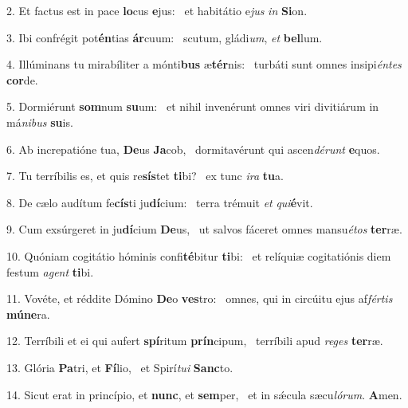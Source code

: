 2. Et factus est in pace \textbf{lo}cus \textbf{e}jus: \ast\  et habitátio e\textit{jus} \textit{in} \textbf{Si}on.\

3. Ibi confrégit pot\textbf{én}tias \textbf{ár}cuum: \ast\  scutum, gládi\textit{um}, \textit{et} \textbf{bel}lum.\

4. Illúminans tu mirabíliter a mónti\textbf{bus} æ\textbf{tér}nis: \ast\  turbáti sunt omnes insipi\textit{én}\textit{tes} \textbf{cor}de.\

5. Dormiérunt \textbf{som}num \textbf{su}um: \ast\  et nihil invenérunt omnes viri divitiárum in má\textit{ni}\textit{bus} \textbf{su}is.\

6. Ab increpatióne tua, \textbf{De}us \textbf{Ja}cob, \ast\  dormitavérunt qui ascen\textit{dé}\textit{runt} \textbf{e}quos.\

7. Tu terríbilis es, et quis re\textbf{sís}tet \textbf{ti}bi? \ast\  ex tunc \textit{i}\textit{ra} \textbf{tu}a.\

8. De cælo audítum fe\textbf{cís}ti ju\textbf{dí}cium: \ast\  terra trémuit \textit{et} \textit{qui}\textbf{é}vit.\

9. Cum exsúrgeret in ju\textbf{dí}cium \textbf{De}us, \ast\  ut salvos fáceret omnes mansu\textit{é}\textit{tos} \textbf{ter}ræ.\

10. Quóniam cogitátio hóminis confi\textbf{té}bitur \textbf{ti}bi: \ast\  et relíquiæ cogitatiónis diem festum \textit{a}\textit{gent} \textbf{ti}bi.\

11. Vovéte, et réddite Dómino \textbf{De}o \textbf{ves}tro: \ast\  omnes, qui in circúitu ejus af\textit{fér}\textit{tis} \textbf{mú}\textbf{ne}ra.\

12. Terríbili et ei qui aufert \textbf{spí}ritum \textbf{prín}cipum, \ast\  terríbili apud \textit{re}\textit{ges} \textbf{ter}ræ.\

13. Glória \textbf{Pa}tri, et \textbf{Fí}lio, \ast\  et Spirí\textit{tu}\textit{i} \textbf{Sanc}to.\

14. Sicut erat in princípio, et \textbf{nunc}, et \textbf{sem}per, \ast\  et in sǽcula sæcu\textit{ló}\textit{rum}. \textbf{A}men.\

